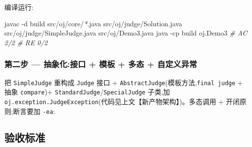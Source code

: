 \documentclass[
  11pt,
]{ctexart}
\newenvironment{Shaded}{\begin{snugshade}}{\end{snugshade}}
\newcommand{\AttributeTok}[1]{\textcolor[rgb]{0.13,0.29,0.53}{#1}}
\newcommand{\CommentTok}[1]{\textcolor[rgb]{0.56,0.35,0.01}{\textit{#1}}}
\newcommand{\ExtensionTok}[1]{#1}
\newcommand{\FunctionTok}[1]{\textcolor[rgb]{0.13,0.29,0.53}{\textbf{#1}}}
\newcommand{\NormalTok}[1]{#1}
\newcommand{\PreprocessorTok}[1]{\textcolor[rgb]{0.56,0.35,0.01}{\textit{#1}}}
\newcommand{\StringTok}[1]{\textcolor[rgb]{0.31,0.60,0.02}{#1}}
\newcommand{\VariableTok}[1]{\textcolor[rgb]{0.00,0.00,0.00}{#1}}
\begin{document}
编译运行:

\begin{Shaded}
\begin{Highlighting}[]
\ExtensionTok{javac} \AttributeTok{{-}d}\NormalTok{ build src/oj/core/}\PreprocessorTok{*}\NormalTok{.java src/oj/judge/Solution.java src/oj/judge/SimpleJudge.java src/oj/Demo3.java}
\ExtensionTok{java} \AttributeTok{{-}cp}\NormalTok{ build oj.Demo3}
\CommentTok{\# AC 2/2}
\CommentTok{\# RE 0/2}
\end{Highlighting}
\end{Shaded}

\hypertarget{ux7b2cux4e8cux6b65-ux62bdux8c61ux5316ux63a5ux53e3-ux6a21ux677f-ux591aux6001-ux81eaux5b9aux4e49ux5f02ux5e38}{%
\subsubsection{\texorpdfstring{第二步 \GC --- 抽象化:接口 + 模板 + 多态
+
自定义异常}{第二步 --- 抽象化:接口 + 模板 + 多态 + 自定义异常}}\label{ux7b2cux4e8cux6b65-ux62bdux8c61ux5316ux63a5ux53e3-ux6a21ux677f-ux591aux6001-ux81eaux5b9aux4e49ux5f02ux5e38}}

把 \texttt{SimpleJudge} 重构成 \texttt{Judge} 接口 +
\texttt{AbstractJudge}(模板方法,\texttt{final\ judge} + 抽象
\texttt{compare})+ \texttt{StandardJudge}/\texttt{SpecialJudge} 子类,加
\texttt{oj.exception.JudgeException}(代码见上文【新产物架构】)。多态调用
+ 开闭原则;断言要加 \texttt{-ea}:

\begin{Shaded}
\end{Shaded}

\hypertarget{ux9a8cux6536ux6807ux51c6-3}{%
\subsection{验收标准}\label{ux9a8cux6536ux6807ux51c6-3}}
\end{document}
